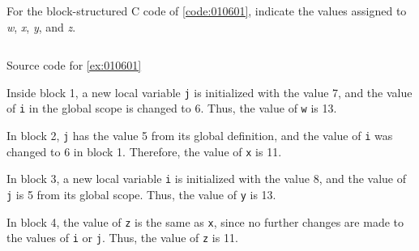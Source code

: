 \begin{exercise}\label{ex:010601}
    For the block-structured C code of \cref{code:010601}, indicate the values assigned to 
    \textit{w}, \textit{x}, \textit{y}, and \textit{z}.
    \begin{listing}[!ht]
    \inputminted[linenos=true,frame=single]{c}{01/06/01/ex010601.c}
    \caption{Source code for \cref{ex:010601}}
    \label{code:010601}
    \end{listing}
\end{exercise}
\begin{solution}\label{sol:010601}
    Inside block 1, a new local variable \texttt{j} is initialized 
    with the value 7, and the value of \texttt{i} in the global scope is changed 
    to 6. Thus, the value of \texttt{w} is 13.

    \noindent In block 2, \texttt{j} has the value 5 from its global definition,
    and the value of \texttt{i} was changed to 6 in block 1. Therefore, the 
    value of \texttt{x} is 11.

    \noindent In block 3, a new local variable \texttt{i} is initialized
    with the value 8, and the value of \texttt{j} is 5 from its global scope.
    Thus, the value of \texttt{y} is 13.

    \noindent In block 4, the value of \texttt{z} is the same as \texttt{x},
    since no further changes are made to the values of \texttt{i} or \texttt{j}.
    Thus, the value of \texttt{z} is 11. 
\end{solution}